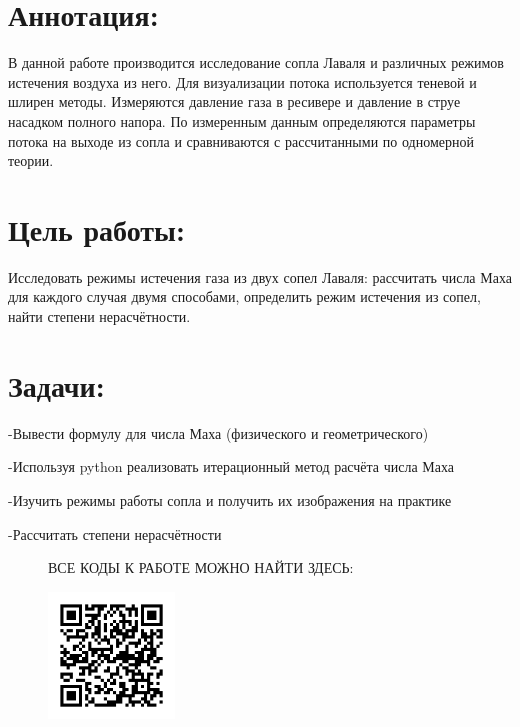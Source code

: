 \documentclass[a4paper]{article}
\begin{document}


\section*{Аннотация:}
В данной работе производится исследование сопла Лаваля и различных режимов истечения воздуха из него. Для визуализации потока используется теневой и шлирен методы. Измеряются давление газа в ресивере и давление в струе насадком полного напора. По измеренным данным определяются параметры потока на выходе из сопла и сравниваются с рассчитанными по одномерной теории. 

\section*{Цель работы:}
Исследовать режимы истечения газа из двух сопел Лаваля: рассчитать числа Маха для каждого случая двумя способами, определить режим истечения из сопел, найти степени нерасчётности.

\section*{Задачи: }
\begin{numerate} 
  \item -Вывести формулу для числа Маха (физического и геометрического)
  \item -Используя python реализовать итерационный метод расчёта числа Маха
  \item -Изучить режимы работы сопла и получить их изображения на практике
  \item -Рассчитать степени нерасчётности
\end{numerate}

\vspace{4cm}

\begin {figure}[H]
\begin{center}
\large{ВСЕ КОДЫ К РАБОТЕ МОЖНО НАЙТИ ЗДЕСЬ:}
\par
\includegraphics[width=0.3\textwidth]{qr.png}
\end{center}
\end {figure}
\end{document}
